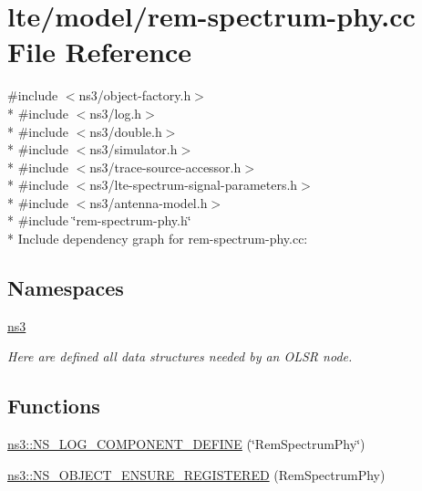 \hypertarget{lte_2model_2rem-spectrum-phy_8cc}{}\section{lte/model/rem-\/spectrum-\/phy.cc File Reference}
\label{lte_2model_2rem-spectrum-phy_8cc}
{\ttfamily \#include $<$ns3/object-\/factory.\+h$>$}\\*
{\ttfamily \#include $<$ns3/log.\+h$>$}\\*
{\ttfamily \#include $<$ns3/double.\+h$>$}\\*
{\ttfamily \#include $<$ns3/simulator.\+h$>$}\\*
{\ttfamily \#include $<$ns3/trace-\/source-\/accessor.\+h$>$}\\*
{\ttfamily \#include $<$ns3/lte-\/spectrum-\/signal-\/parameters.\+h$>$}\\*
{\ttfamily \#include $<$ns3/antenna-\/model.\+h$>$}\\*
{\ttfamily \#include \char`\"{}rem-\/spectrum-\/phy.\+h\char`\"{}}\\*
Include dependency graph for rem-\/spectrum-\/phy.cc\+:
\subsection*{Namespaces}
\begin{DoxyCompactItemize}
\item 
 \hyperlink{namespacens3}{ns3}
\begin{DoxyCompactList}\small\item\em Here are defined all data structures needed by an O\+L\+SR node. \end{DoxyCompactList}\end{DoxyCompactItemize}
\subsection*{Functions}
\begin{DoxyCompactItemize}
\item 
\hyperlink{namespacens3_a25e3dce787023244a4dc9271190670d6}{ns3\+::\+N\+S\+\_\+\+L\+O\+G\+\_\+\+C\+O\+M\+P\+O\+N\+E\+N\+T\+\_\+\+D\+E\+F\+I\+NE} (\char`\"{}Rem\+Spectrum\+Phy\char`\"{})
\item 
\hyperlink{namespacens3_aa31d1958f0cd7cfb906caa74efb86181}{ns3\+::\+N\+S\+\_\+\+O\+B\+J\+E\+C\+T\+\_\+\+E\+N\+S\+U\+R\+E\+\_\+\+R\+E\+G\+I\+S\+T\+E\+R\+ED} (Rem\+Spectrum\+Phy)
\end{DoxyCompactItemize}
